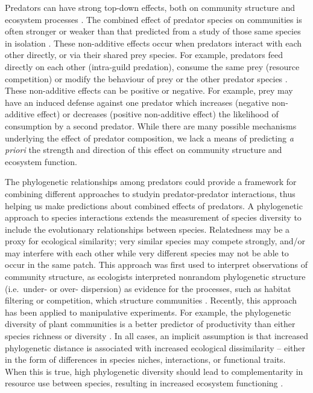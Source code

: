 \documentclass[11pt]{article}
\begin{document}
Predators can have strong top-down effects, both on community structure
and ecosystem processes \citep{Estes2011}. The combined effect of
predator species on communities is often stronger or weaker than that
predicted from a study of those same species in isolation
\citep{Sih1998a, Ives2005}. These non-additive effects occur when
predators interact with each other directly, or via their shared prey
species. For example, predators feed directly on each other (intra-guild
predation), consume the same prey (resource competition) or modify the
behaviour of prey or the other predator species
\citep{Sih1998a, Griswold2006, Nystrom2001}. These non-additive effects
can be positive or negative. For example, prey may have an induced
defense against one predator which increases (negative non-additive
effect) or decreases (positive non-additive effect) the likelihood of
consumption by a second predator. While there are many possible
mechanisms underlying the effect of predator composition, we lack a
means of predicting \emph{a priori} the strength and direction of this
effect on community structure and ecosystem function.

The phylogenetic relationships among predators could provide a framework for combining different approaches to studyin predator-predator interactions, thus helping us make
predictions about combined effects of predators. A phylogenetic approach to species interactions
extends the measurement of species diversity to include the evolutionary
relationships between species. Relatedness may be a proxy for ecological similarity; very
similar species may compete strongly, and/or may interfere with each
other while very different species may not be able to occur in the same
patch. This approach was first used to interpret observations of
community structure, as ecologists interpreted nonrandom phylogenetic
structure (i.e.~under- or over- dispersion) as evidence for the
processes, such as habitat filtering or competition, which structure
communities \citep{Webb2002, Cavender-Bares2009}. Recently, this
approach has been applied to manipulative experiments. For example, the
phylogenetic diversity of plant communities is a better predictor of
productivity than either species richness or diversity
\citep[e.g.][]{Cadotte2009, Cadotte2008, Godoy2014}. In all cases, an
implicit assumption is that increased phylogenetic distance is
associated with increased ecological dissimilarity -- either in the form
of differences in species niches, interactions, or functional traits.
When this is true, high phylogenetic diversity should lead to
complementarity in resource use between species, resulting in increased
ecosystem functioning \citep{Srivastava2012c}. 
\end{document}
